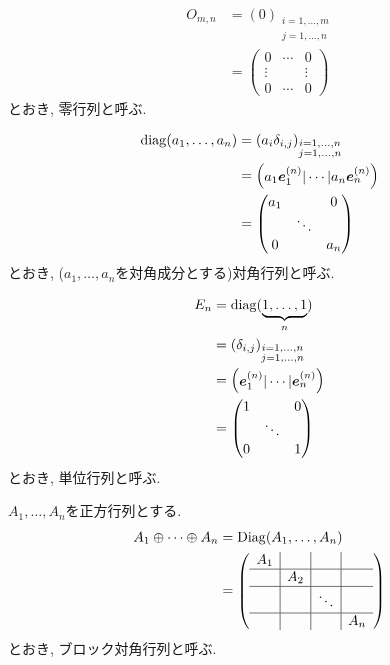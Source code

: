 \begin{align*}
  O_{m,n}&=(0)_{\substack{i=1,\ldots,m\\j=1,\ldots,n}}\\
  &=
  \begin{pmatrix}
    0&\cdots&0\\
    \vdots&&\vdots\\
    0&\cdots&0
  \end{pmatrix}
\end{align*}
とおき,
零行列と呼ぶ.


\begin{align*}
  \operatorname{diag}(a_1,\ldots,a_n)
  &=(a_i\delta_{i,j})_{\substack{i=1,\ldots,n\\j=1,\ldots,n}}\\
  &=\begin{pmatrix}a_1\boldsymbol{e}^{(n)}_1|\cdots|a_n\boldsymbol{e}^{(n)}_n\end{pmatrix}\\
  &=\begin{pmatrix}
  a_1&&0\\
  &\ddots&\\
  0&&a_n
  \end{pmatrix}
\end{align*}
とおき,
($a_1,\ldots,a_n$を対角成分とする)対角行列と呼ぶ.

\begin{align*}
  E_n&=
  \operatorname{diag}(\underbrace{1,\ldots,1}_{n})\\
  &=(\delta_{i,j})_{\substack{i=1,\ldots,n\\j=1,\ldots,n}}\\
  &=\begin{pmatrix}\boldsymbol{e}^{(n)}_1|\cdots|\boldsymbol{e}^{(n)}_n\end{pmatrix}\\
  &=\begin{pmatrix}
  1&&0\\
  &\ddots&\\
  0&&1
  \end{pmatrix}
\end{align*}
とおき,
単位行列と呼ぶ.



$A_1,\ldots,A_n$を正方行列とする.
\begin{align*}
  A_1\oplus\cdots\oplus A_n
  &=\operatorname{Diag}(A_1,\ldots,A_n)\\
  &=
  \left(
  \begin{array}{c|c|c|c}
    A_1&&&\\\hline
    &A_2&&\\\hline
    &&\ddots&\\\hline
    &&&A_n
    \end{array}
  \right)
\end{align*}
とおき,
ブロック対角行列と呼ぶ.


